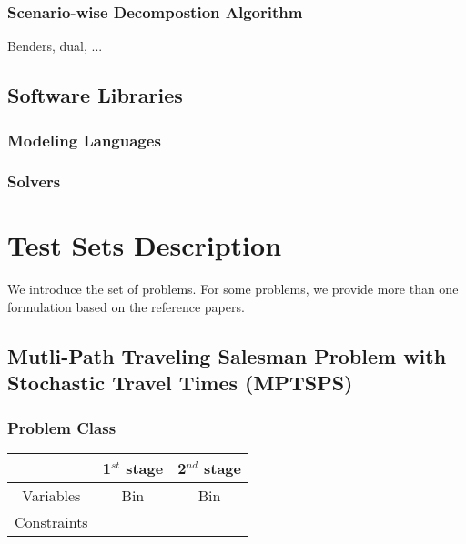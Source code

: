 \subsubsection{Scenario-wise Decompostion Algorithm}
Benders, dual, ...

\subsection{Software Libraries}
\subsubsection{Modeling Languages}
\subsubsection{Solvers}

\section{Test Sets Description}

We introduce the set of problems. For some problems, we provide more than one formulation based on the reference papers. 
\subsection{Mutli-Path Traveling Salesman Problem with Stochastic Travel Times (MPTSPS)}
\subsubsection{Problem Class}
\begin{table}[H]
	\centering
	\label{mptsps-class}
	\begin{tabular}{|c|c|c|}
		\hline
		& 1$^{st}$ stage & 2$^{nd}$ stage \\ \hline
		Variables   & Bin & Bin               \\ \hline
		Constraints &                &                \\ \hline
	\end{tabular}
\end{table}
